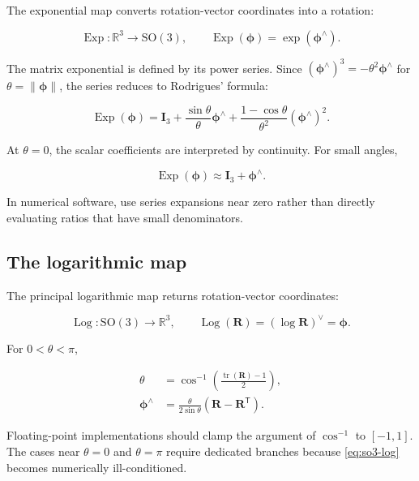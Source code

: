 \documentclass[10pt,a4paper]{article}
\numberwithin{equation}{section}
\newcommand{\Subsection}[1]{\subsection{#1}}
\newcommand{\SOthree}{\mathrm{SO}(3)}
\newcommand{\Exp}{\operatorname{Exp}}
\newcommand{\Log}{\operatorname{Log}}
\newcommand{\tr}{\operatorname{tr}}
\newcommand{\vect}[1]{\boldsymbol{#1}}
\theoremstyle{definition}
\theoremstyle{exercisestyle}
\begin{document}
The exponential map converts rotation-vector coordinates into a rotation:

\begin{equation}
    \Exp:\mathbb{R}^3\rightarrow\SOthree,
    \qquad
    \Exp(\vect{\phi})=\exp(\vect{\phi}^\wedge).
\end{equation}

The matrix exponential is defined by its power series. Since
$(\vect{\phi}^\wedge)^3=-\theta^2\vect{\phi}^\wedge$ for
$\theta=\|\vect{\phi}\|$, the series reduces to Rodrigues' formula:

\begin{equation}
    \Exp(\vect{\phi})=
    \mathbf{I}_3
    +\frac{\sin\theta}{\theta}\vect{\phi}^\wedge
    +\frac{1-\cos\theta}{\theta^2}(\vect{\phi}^\wedge)^2.
    \label{eq:so3-exp}
\end{equation}

At $\theta=0$, the scalar coefficients are interpreted by continuity. For
small angles,

\begin{equation}
    \Exp(\vect{\phi})\approx\mathbf{I}_3+\vect{\phi}^\wedge.
\end{equation}

In numerical software, use series expansions near zero rather than directly
evaluating ratios that have small denominators.

\Subsection{The logarithmic map}

The principal logarithmic map returns rotation-vector coordinates:

\begin{equation}
    \Log:\SOthree\rightarrow\mathbb{R}^3,
    \qquad
    \Log(\mathbf{R})=(\log\mathbf{R})^\vee=\vect{\phi}.
\end{equation}

For $0<\theta<\pi$,

\begin{align}
    \theta & ={\cos}^{-1}\left(\frac{\tr(\mathbf{R})-1}{2}\right),
    \label{eq:so3-log-angle}                                       \\
    \vect{\phi}^\wedge
           & =\frac{\theta}{2\sin\theta}
    (\mathbf{R}-\mathbf{R}^{\mathsf T}).
    \label{eq:so3-log}
\end{align}

Floating-point implementations should clamp the argument of ${\cos}^{-1}$ to
$[-1,1]$. The cases near $\theta=0$ and $\theta=\pi$ require dedicated
branches because \eqref{eq:so3-log} becomes numerically ill-conditioned.
\end{document}
